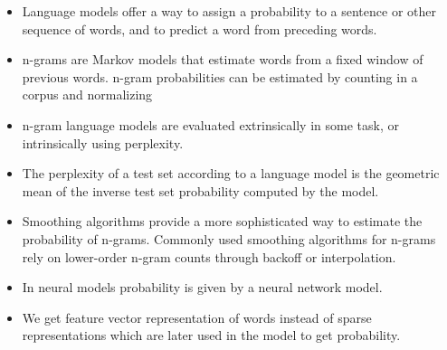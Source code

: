 \documentclass[11pt]{article}
\providecommand{\tightlist}{%
      \setlength{\itemsep}{0pt}\setlength{\parskip}{0pt}}
\begin{document}
\begin{itemize}
\tightlist
\item
  Language models offer a way to assign a probability to a sentence or
  other sequence of words, and to predict a word from preceding words.
\item
  n-grams are Markov models that estimate words from a fixed window of
  previous words. n-gram probabilities can be estimated by counting in a
  corpus and normalizing
\item
  n-gram language models are evaluated extrinsically in some task, or
  intrinsically using perplexity.
\item
  The perplexity of a test set according to a language model is the
  geometric mean of the inverse test set probability computed by the
  model.
\item
  Smoothing algorithms provide a more sophisticated way to estimate the
  probability of n-grams. Commonly used smoothing algorithms for n-grams
  rely on lower-order n-gram counts through backoff or interpolation.
\item
  In neural models probability is given by a neural network model.
\item
  We get feature vector representation of words instead of sparse
  representations which are later used in the model to get probability.
\end{itemize}
\end{document}
